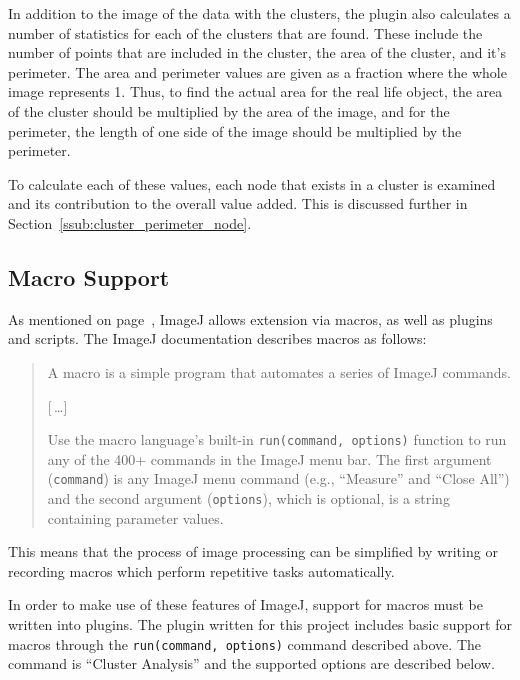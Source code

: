 In addition to the image of the data with the clusters, the plugin also
calculates a number of statistics for each of the clusters that are found.
These include the number of points that are included in the cluster, the area
of the cluster, and it's perimeter. The area and perimeter values are given as
a fraction where the whole image represents 1. Thus, to find the actual area
for the real life object, the area of the cluster should be multiplied by the
area of the image, and for the perimeter, the length of one side of the image
should be multiplied by the perimeter.

To calculate each of these values, each node that exists in a cluster is
examined and its contribution to the overall value added. This is discussed
further in Section~\ref{ssub:cluster_perimeter_node}.

\subsection{Macro Support}
\label{sub:macro_support}

As mentioned on page~\pageref{prt:imagej_plugin}, ImageJ allows extension via
macros, as well as plugins and scripts. The ImageJ documentation describes
macros as follows:

\begin{quote}
	A macro is a simple program that automates a series of ImageJ
	commands.

	[\,\ldots]

	Use the macro language's built-in \texttt{run(command,
	options)} function to run any of the 400+ commands in the ImageJ menu
	bar.  The first argument (\texttt{command}) is any ImageJ menu command
	(e.g., ``Measure'' and ``Close All'') and the second argument
	(\texttt{options}), which is optional, is a string containing parameter
	values.\\
	\hspace*{\fill}\cite{imagejapi}
\end{quote}

This means that the process of image processing can be simplified by writing or
recording macros which perform repetitive tasks automatically.

In order to make use of these features of ImageJ, support for macros must be
written into plugins. The plugin written for this project includes basic
support for macros through the \texttt{run(command, options)} command described
above. The command is ``Cluster Analysis'' and the supported options are
described below.

